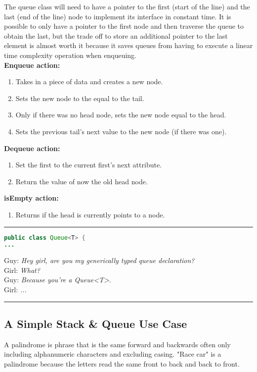 \documentclass[letterpaper, 10pt]{article}
\begin{document}
The queue class will need to have a pointer to the first (start of the line) and the last (end of the line) node
to implement its interface in constant time. It is possible to only have a pointer to the first node and then traverse
the queue to obtain the last, but the trade off to store an additional pointer to the last element is almost worth it because
it saves queues from having to execute a linear time complexity operation when enqueuing.\\
\newpage
\textbf{Enqueue action:}
\begin{enumerate}
    \item Takes in a piece of data and creates a new node.
    \item Sets the new node to the equal to the tail.
    \item Only if there was no head node, sets the new node equal to the head.
    \item Sets the previous tail's next value to the new node (if there was one).
\end{enumerate}

\textbf{Dequeue action:}
\begin{enumerate}
    \item Set the first to the current first's next attribute.
    \item Return the value of now the old head node.
\end{enumerate}

\textbf{isEmpty action:}
\begin{enumerate}
    \item Returns if the head is currently points to a node.
\end{enumerate}
\newpage
\hrule
\begin{lstlisting}[language=Java]
public class Queue<T> {
...
\end{lstlisting}
Guy: \textit{Hey girl, are you my generically typed queue declaration?}\\
Girl: \textit{What?}\\
Guy: \textit{Because you're a Queue\textless T\textgreater}.\\
Girl: \textit{...}\\
\hrule
\vspace{1cm}
\subsection{A Simple Stack \& Queue Use Case}
A palindrome is phrase that is the same forward and backwards often only including
alphanumeric characters and excluding casing.  "Race car" is a palindrome because the letters read the same
front to back and back to front.
\end{document}
